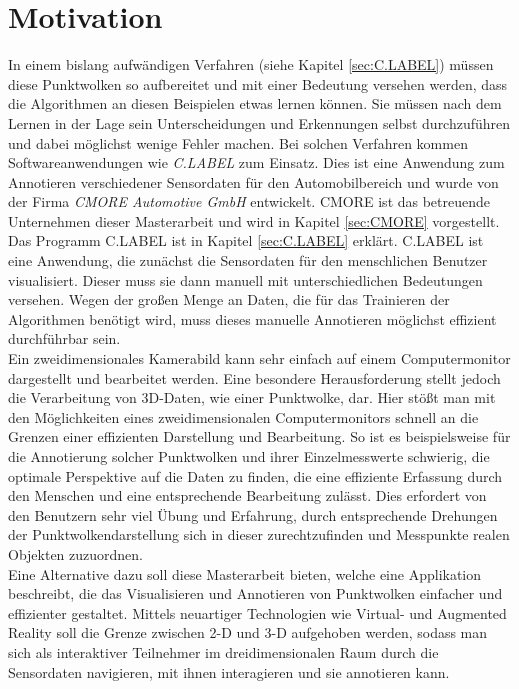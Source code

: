 \section{Motivation}
In einem bislang aufwändigen Verfahren (siehe Kapitel \ref{sec:C.LABEL}) müssen diese Punktwolken so aufbereitet und mit einer Bedeutung versehen werden, dass die Algorithmen an diesen Beispielen etwas lernen können. Sie müssen nach dem Lernen in der Lage sein Unterscheidungen und Erkennungen selbst durchzuführen und dabei möglichst wenige Fehler machen. Bei solchen Verfahren kommen Softwareanwendungen wie \textit{C.LABEL} zum Einsatz. Dies ist eine Anwendung zum Annotieren verschiedener Sensordaten für den Automobilbereich und wurde von der Firma \textit{CMORE Automotive GmbH} entwickelt. CMORE ist das betreuende Unternehmen dieser Masterarbeit und wird in Kapitel \ref{sec:CMORE} vorgestellt. Das Programm C.LABEL ist in Kapitel \ref{sec:C.LABEL} erklärt. C.LABEL ist eine Anwendung, die zunächst die Sensordaten für den menschlichen Benutzer visualisiert. Dieser muss sie dann manuell mit unterschiedlichen Bedeutungen versehen. Wegen der großen Menge an Daten, die für das Trainieren der Algorithmen benötigt wird, muss dieses manuelle Annotieren möglichst effizient durchführbar sein.\\

Ein zweidimensionales Kamerabild kann sehr einfach auf einem Computermonitor dargestellt und bearbeitet werden. Eine besondere Herausforderung stellt jedoch die Verarbeitung von 3D-Daten, wie einer Punktwolke, dar. Hier stößt man mit den Möglichkeiten eines zweidimensionalen Computermonitors schnell an die Grenzen einer effizienten Darstellung und Bearbeitung. So ist es beispielsweise für die Annotierung solcher Punktwolken und ihrer Einzelmesswerte schwierig, die optimale Perspektive auf die Daten zu finden, die eine effiziente Erfassung durch den Menschen und eine entsprechende Bearbeitung zulässt. Dies erfordert von den Benutzern sehr viel Übung und Erfahrung, durch entsprechende Drehungen der Punktwolkendarstellung sich in dieser zurechtzufinden und Messpunkte realen Objekten zuzuordnen.\\ 

Eine Alternative dazu soll diese Masterarbeit bieten, welche eine Applikation beschreibt, die das Visualisieren und Annotieren von Punktwolken einfacher und effizienter gestaltet. Mittels neuartiger Technologien wie Virtual- und Augmented Reality soll die Grenze zwischen 2-D und 3-D aufgehoben werden, sodass man sich als interaktiver Teilnehmer im dreidimensionalen Raum durch die Sensordaten navigieren, mit ihnen interagieren und sie annotieren kann.\\

